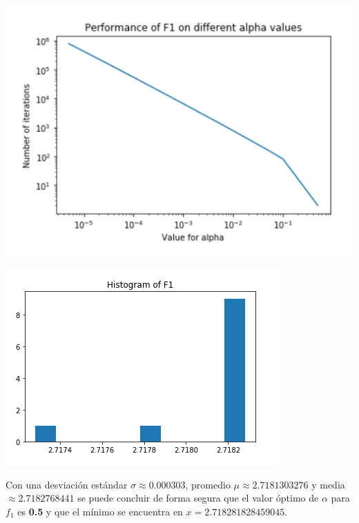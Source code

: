 \documentclass[10pt,letterpaper]{article}
\begin{document}
\begin{enumerate}
\begin{enumerate}
                    \begin{multicols}{2}
                        \begin{center}
                            \includegraphics[scale=.4]{assets/theory/1-a/f1-performance.png}
                        \end{center}
                        \begin{center}
                            \includegraphics[scale=.5]{assets/theory/1-a/f1-dist.png}
                        \end{center}
                    \end{multicols}

                    Con una desviación estándar $\sigma \approx 0.000303$,
                    promedio $\mu \approx 2.7181303276$ y media $\approx 2.7182768441$
                    se puede concluir de forma segura que el valor óptimo de $\alpha$ para
                    $f_1$ es \textbf{0.5} y que el mínimo se encuentra en
                    $x=2.718281828459045$.


\end{enumerate}
\end{enumerate}
\end{document}
